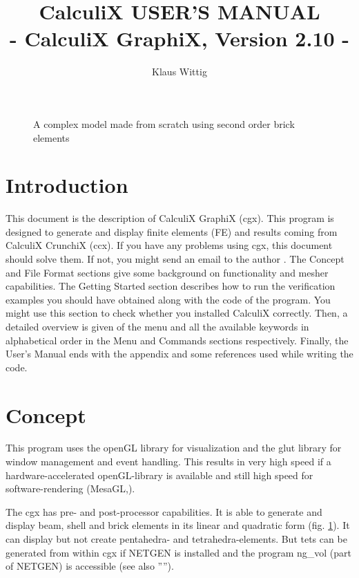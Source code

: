 \documentclass{article}
\begin{document}
\title{CalculiX USER'S MANUAL\\ - CalculiX GraphiX, Version 2.10 -}
\author{Klaus Wittig}
\maketitle
\begin{figure}[h]
\caption{\label{cover} A complex model made from scratch using second order brick elements }
\end{figure}
\newpage


\tableofcontents


\section{Introduction}
 This document is the description of CalculiX GraphiX (cgx). This program is designed to generate and display finite elements (FE) and results coming from CalculiX CrunchiX (ccx). If you have any problems using cgx, this document should solve them. If not, you might send an email to the author \cite{cgx}. The Concept and File Format sections give some background on functionality and mesher capabilities. The Getting Started section describes how to run the verification examples you should have obtained along with the code of the program. You might use this section to check whether you installed CalculiX correctly. Then, a detailed overview is given of the menu and all the available keywords in alphabetical order in the Menu and Commands sections respectively. Finally, the User's Manual ends with the appendix and some references used while writing the code.


\section{Concept}
This program uses the openGL library for visualization and the glut library \cite{glut} for window management and event handling. This results in very high speed if a hardware-accelerated openGL-library is available and still high speed for software-rendering (MesaGL,\cite{mesa}). 

The cgx has pre- and post-processor capabilities. It is able to generate and display beam, shell and brick elements in its linear and quadratic form (fig. \ref{cover}). It can display but not create pentahedra- and tetrahedra-elements. But tets can be generated from within cgx if NETGEN \cite{NETGEN} is installed and the program ng\_vol (part of NETGEN) is accessible (see also '''').
\end{document}
